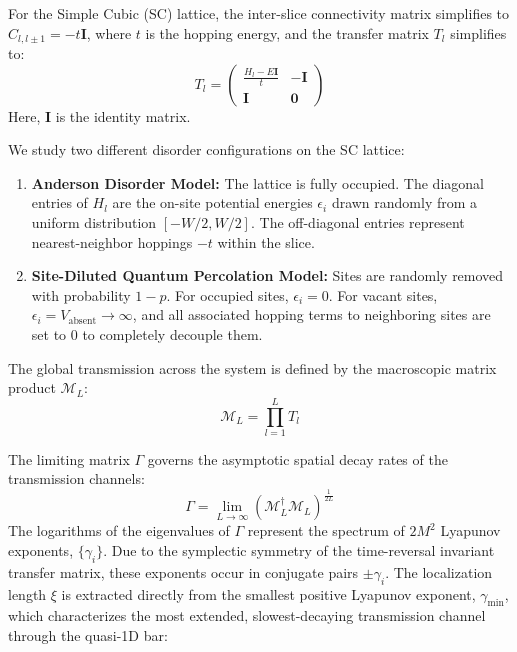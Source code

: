 For the Simple Cubic (SC) lattice, the inter-slice connectivity matrix simplifies to $C_{l, l\pm1} = -t\mathbf{I}$, where $t$ is the hopping energy, and the transfer matrix $T_l$ simplifies to:
\begin{equation}
T_l = \begin{pmatrix} \frac{H_l - E\mathbf{I}}{t} & -\mathbf{I} \\ \mathbf{I} & \mathbf{0} \end{pmatrix}
\end{equation}
Here, $\mathbf{I}$ is the identity matrix.

We study two different disorder configurations on the SC lattice:
\begin{enumerate}
    \item \textbf{Anderson Disorder Model:} The lattice is fully occupied. The diagonal entries of $H_l$ are the on-site potential energies $\epsilon_i$ drawn randomly from a uniform distribution $[-W/2, W/2]$. The off-diagonal entries represent nearest-neighbor hoppings $-t$ within the slice.
    \item \textbf{Site-Diluted Quantum Percolation Model:} Sites are randomly removed with probability $1-p$. For occupied sites, $\epsilon_i = 0$. For vacant sites, $\epsilon_i = V_{\text{absent}} \to \infty$, and all associated hopping terms to neighboring sites are set to $0$ to completely decouple them.
\end{enumerate}

The global transmission across the system is defined by the macroscopic matrix product $\mathcal{M}_L$:
\begin{equation}
\mathcal{M}_L = \prod_{l=1}^L T_l
\end{equation}

The limiting matrix $\Gamma$ governs the asymptotic spatial decay rates of the transmission channels:
\begin{equation}
\Gamma = \lim_{L \to \infty} \left( \mathcal{M}_L^\dagger \mathcal{M}_L \right)^{\frac{1}{2L}}
\end{equation}
The logarithms of the eigenvalues of $\Gamma$ represent the spectrum of $2M^2$ Lyapunov exponents, $\{\gamma_i\}$. Due to the symplectic symmetry of the time-reversal invariant transfer matrix, these exponents occur in conjugate pairs $\pm \gamma_i$. The localization length $\xi$ is extracted directly from the smallest positive Lyapunov exponent, $\gamma_{\text{min}}$, which characterizes the most extended, slowest-decaying transmission channel through the quasi-1D bar:

